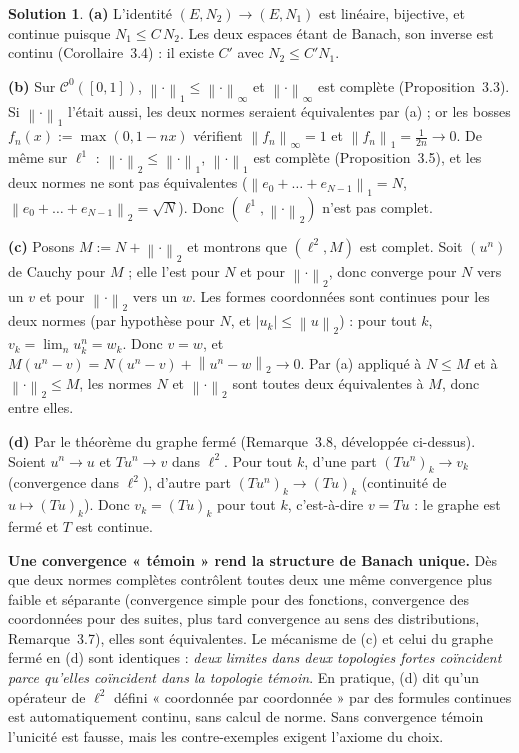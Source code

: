 \documentclass[11pt,a4paper]{article}
\newcommand{\norm}[1]{\left\|#1\right\|}
\newcommand{\Cz}{\mathcal{C}^0}
\newcommand{\ie}{c'est-à-dire}
\theoremstyle{definition}
\newtheorem*{solution}{Solution}
\begin{document}
\begin{solution}
\noindent\textbf{(a)} L'identité $(E,N_2)\to(E,N_1)$ est linéaire, bijective, et continue puisque $N_1\le C\,N_2$. Les deux espaces étant de Banach, son inverse est continu (Corollaire~3.4) : il existe $C'$ avec $N_2\le C'N_1$.

\medskip
\noindent\textbf{(b)} Sur $\Cz([0,1])$, $\norm\cdot_1\le\norm\cdot_\infty$ et $\norm\cdot_\infty$ est complète (Proposition~3.3). Si $\norm\cdot_1$ l'était aussi, les deux normes seraient équivalentes par (a) ; or les bosses $f_n(x):=\max(0,1-nx)$ vérifient $\norm{f_n}_\infty=1$ et $\norm{f_n}_1=\frac1{2n}\to0$. De même sur $\ell^1$ : $\norm\cdot_2\le\norm\cdot_1$, $\norm\cdot_1$ est complète (Proposition~3.5), et les deux normes ne sont pas équivalentes ($\norm{e_0+\dots+e_{N-1}}_1=N$, $\norm{e_0+\dots+e_{N-1}}_2=\sqrt N$). Donc $(\ell^1,\norm\cdot_2)$ n'est pas complet.

\medskip
\noindent\textbf{(c)} Posons $M:=N+\norm\cdot_2$ et montrons que $(\ell^2,M)$ est complet. Soit $(u^n)$ de Cauchy pour $M$ ; elle l'est pour $N$ et pour $\norm\cdot_2$, donc converge pour $N$ vers un $v$ et pour $\norm\cdot_2$ vers un $w$. Les formes coordonnées sont continues pour les deux normes (par hypothèse pour $N$, et $|u_k|\le\norm u_2$) : pour tout $k$, $v_k=\lim_nu^n_k=w_k$. Donc $v=w$, et $M(u^n-v)=N(u^n-v)+\norm{u^n-w}_2\to0$. Par (a) appliqué à $N\le M$ et à $\norm\cdot_2\le M$, les normes $N$ et $\norm\cdot_2$ sont toutes deux équivalentes à $M$, donc entre elles.

\medskip
\noindent\textbf{(d)} Par le théorème du graphe fermé (Remarque~3.8, développée ci-dessus). Soient $u^n\to u$ et $Tu^n\to v$ dans $\ell^2$. Pour tout $k$, d'une part $(Tu^n)_k\to v_k$ (convergence dans $\ell^2$), d'autre part $(Tu^n)_k\to(Tu)_k$ (continuité de $u\mapsto(Tu)_k$). Donc $v_k=(Tu)_k$ pour tout $k$, \ie{} $v=Tu$ : le graphe est fermé et $T$ est continue.
\end{solution}

\begin{pointcle}
\textbf{Une convergence « témoin » rend la structure de Banach unique.} Dès que deux normes complètes contrôlent toutes deux une même convergence plus faible et séparante (convergence simple pour des fonctions, convergence des coordonnées pour des suites, plus tard convergence au sens des distributions, Remarque~3.7), elles sont équivalentes. Le mécanisme de (c) et celui du graphe fermé en (d) sont identiques : \emph{deux limites dans deux topologies fortes coïncident parce qu'elles coïncident dans la topologie témoin}. En pratique, (d) dit qu'un opérateur de $\ell^2$ défini « coordonnée par coordonnée » par des formules continues est automatiquement continu, sans calcul de norme. Sans convergence témoin l'unicité est fausse, mais les contre-exemples exigent l'axiome du choix.
\end{pointcle}
\end{document}
